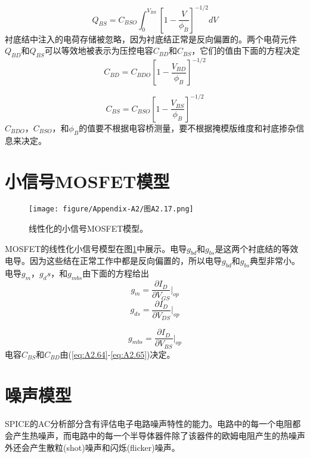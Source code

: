 \begin{equation}
    Q_{BS} = C_{BSO}\int^{V_{BS}}_0[1-\frac{V}{\phi_B}]^{-1/2}dV
    \label{eq:A2.63}
\end{equation}
衬底结中注入的电荷存储被忽略，因为衬底结正常是反向偏置的。两个电荷元件$Q_{BD}$和$Q_{BS}$可以等效地被表示为压控电容$C_{BD}$和$C_{BS}$，它们的值由下面的方程决定
\begin{equation}
    C_{BD} = C_{BDO}[1-\frac{V_{BD}}{\phi_B}]^{-1/2}
    \label{eq:A2.64}
\end{equation}

\begin{equation}
    C_{BS} = C_{BSO}[1-\frac{V_{BS}}{\phi_B}]^{-1/2}
    \label{eq:A2.65}
\end{equation}
$C_{BDO}$，$C_{BSO}$，和$\phi_B$的值要不根据电容桥测量，要不根据掩模版维度和衬底掺杂信息来决定。

\section{小信号MOSFET模型}
\begin{figure}[htbp]
\small
    \centering
    \texttt{[image: figure/Appendix-A2/图A2.17.png]}
    \caption{线性化的小信号MOSFET模型。}
    \label{图A2.17}
\end{figure}

MOSFET的线性化小信号模型在图\ref{图A2.17}中展示。电导$g_{bd}$和$g_{bs}$是这两个衬底结的等效电导。因为这些结在正常工作中都是反向偏置的，所以电导$g_{bd}$和$g_{bs}$典型非常小。电导$g_m$，$g_ds$，和$g_{mbs}$由下面的方程给出
\begin{equation}
    g_m = \frac{\partial I_D}{\partial V_{GS}}|_{op}
    \label{eq:A2.66}
\end{equation}
\begin{equation}
    g_{ds} = \frac{\partial I_D}{\partial V_{DS}}|_{op}
    \label{eq:A2.67}
\end{equation}

\begin{equation}
    g_{mbs} = \frac{\partial I_D}{\partial V_{BS}}|_{op}
    \label{eq:A2.68}
\end{equation}
电容$C_{BS}$和$C_{BD}$由(\ref{eq:A2.64}-\ref{eq:A2.65})决定。

\section{噪声模型}
SPICE的AC分析部分含有评估电子电路噪声特性的能力。电路中的每一个电阻都会产生热噪声，而电路中的每一个半导体器件除了该器件的欧姆电阻产生的热噪声外还会产生散粒(shot)噪声和闪烁(flicker)噪声。

